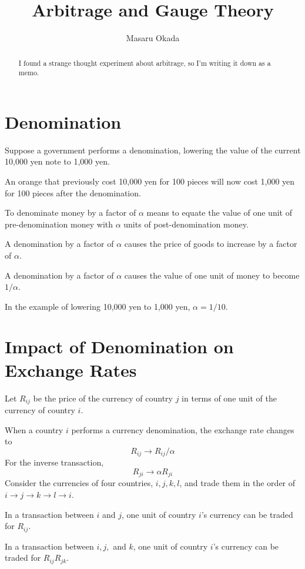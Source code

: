 \documentclass[uplatex]{jsarticle}
\title{
\textbf{Arbitrage and Gauge Theory}
}
\author{
Masaru Okada
}
\begin{document}
\maketitle

\begin{abstract}
	I found a strange thought experiment about arbitrage, so I'm writing it down as a memo.
\end{abstract}

\section{\textbf{Denomination}}

Suppose a government performs a denomination, lowering the value of the current 10,000 yen note to 1,000 yen.

An orange that previously cost 10,000 yen for 100 pieces will now cost 1,000 yen for 100 pieces after the denomination.

To denominate money by a factor of $\alpha$ means to equate the value of one unit of pre-denomination money with $\alpha$ units of post-denomination money.

A denomination by a factor of $\alpha$ causes the price of goods to increase by a factor of $\alpha$.

A denomination by a factor of $\alpha$ causes the value of one unit of money to become $1/\alpha$.

In the example of lowering 10,000 yen to 1,000 yen, $\alpha=1/10$.



\section{\textbf{Impact of Denomination on Exchange Rates}}

Let $R_{ij}$ be the price of the currency of country $j$ in terms of one unit of the currency of country $i$.

When a country $i$ performs a currency denomination, the exchange rate changes to
$$
	R_{ij} \to R_{ij} / \alpha
$$
For the inverse transaction,
$$
	R_{ji} \to \alpha R_{ji}
$$
Consider the currencies of four countries, $i,j,k,l$, and trade them in the order of $i \to j \to k \to l \to i$.

In a transaction between $i$ and $j$, one unit of country $i$'s currency can be traded for $R_{ij}$.

In a transaction between $i,j,$ and $k$, one unit of country $i$'s currency can be traded for
$R_{ij} R_{jk}$.
\end{document}
